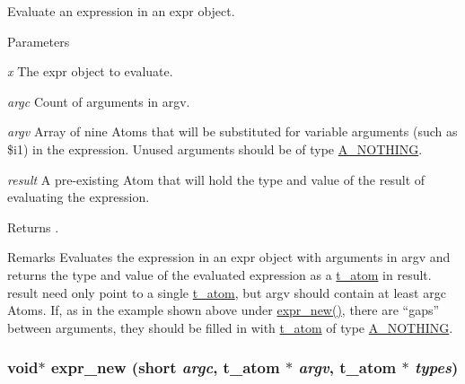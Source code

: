 Evaluate an expression in an expr object. 
\begin{DoxyParams}{Parameters}
\item[{\em x}]The expr object to evaluate. \item[{\em argc}]Count of arguments in argv. \item[{\em argv}]Array of nine Atoms that will be substituted for variable arguments (such as \$i1) in the expression. Unused arguments should be of type \hyperlink{group__atom_gga8aa6700e9f00b132eb376db6e39ade47a858ddb5d5927eae3fd699a82c7e174b6}{A\_\-NOTHING}. \item[{\em result}]A pre-\/existing Atom that will hold the type and value of the result of evaluating the expression. \end{DoxyParams}
\begin{DoxyReturn}{Returns}
.
\end{DoxyReturn}
\begin{DoxyRemark}{Remarks}
Evaluates the expression in an expr object with arguments in argv and returns the type and value of the evaluated expression as a \hyperlink{structt__atom}{t\_\-atom} in result. result need only point to a single \hyperlink{structt__atom}{t\_\-atom}, but argv should contain at least argc Atoms. If, as in the example shown above under \hyperlink{group__expr_ga7430f6be4bb5d54c7ded0a9ba6b8961f}{expr\_\-new()}, there are “gaps” between arguments, they should be filled in with \hyperlink{structt__atom}{t\_\-atom} of type \hyperlink{group__atom_gga8aa6700e9f00b132eb376db6e39ade47a858ddb5d5927eae3fd699a82c7e174b6}{A\_\-NOTHING}. 
\end{DoxyRemark}
\hypertarget{group__expr_ga7430f6be4bb5d54c7ded0a9ba6b8961f}{
\subsubsection[{expr\_\-new}]{\setlength{\rightskip}{0pt plus 5cm}void$\ast$ expr\_\-new (short {\em argc}, \/  {\bf t\_\-atom} $\ast$ {\em argv}, \/  {\bf t\_\-atom} $\ast$ {\em types})}}
\label{group__expr_ga7430f6be4bb5d54c7ded0a9ba6b8961f}


